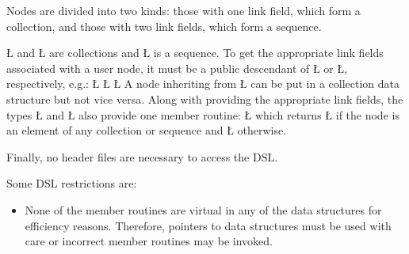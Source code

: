 \documentclass[openright,twoside]{report}
\begin{document}
Nodes are divided into two kinds: those with one link field, which form a collection, and those with two link fields, which form a sequence.
\begin{center}

\end{center}
\LGinlinetrue\LGbegin\lgrinde\L{}\endlgrinde\LGend{} and \LGinlinetrue\LGbegin\lgrinde\L{}\endlgrinde\LGend{} are collections and \LGinlinetrue\LGbegin\lgrinde\L{}\endlgrinde\LGend{} is a sequence.
To get the appropriate link fields associated with a user node, it must be a public descendant of \LGinlinetrue\LGbegin\lgrinde\L{}\endlgrinde\LGend{} or \LGinlinetrue\LGbegin\lgrinde\L{}\endlgrinde\LGend{}, respectively, e.g.:
\LGinlinefalse\LGbegin\lgrinde
\L{}
\L{}
\L{}
\endlgrinde\LGend
A node inheriting from \LGinlinetrue\LGbegin\lgrinde\L{}\endlgrinde\LGend{} can be put in a collection data structure but not vice versa.
Along with providing the appropriate link fields, the types \LGinlinetrue\LGbegin\lgrinde\L{}\endlgrinde\LGend{} and \LGinlinetrue\LGbegin\lgrinde\L{}\endlgrinde\LGend{} also provide one member routine:
\LGinlinefalse\LGbegin\lgrinde
\L{}
\endlgrinde\LGend
{}%
%
which returns \LGinlinetrue\LGbegin\lgrinde\L{}\endlgrinde\LGend{} if the node is an element of any collection or sequence and \LGinlinetrue\LGbegin\lgrinde\L{}\endlgrinde\LGend{} otherwise.

Finally, no header files are necessary to access the \uC DSL.

Some \uC DSL restrictions are:
\begin{itemize}
\item
None of the member routines are virtual in any of the data structures for efficiency reasons.
Therefore, pointers to data structures must be used with care or incorrect member routines may be invoked.
\end{itemize}
\end{document}
